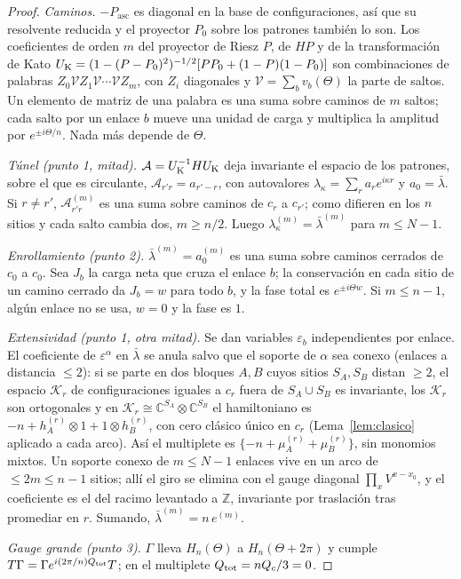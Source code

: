 \documentclass[11pt,a4paper]{article}
\theoremstyle{definition}
\theoremstyle{remark}
\newcommand{\Pasc}{P_{\mathrm{asc}}}
\newcommand{\eps}{\varepsilon}
\begin{document}
\begin{proof}
\emph{Caminos.} $-\Pasc$ es diagonal en la base de configuraciones, así que su resolvente reducida y
el proyector $P_0$ sobre los patrones también lo son. Los coeficientes de orden $m$ del proyector de
Riesz $P$, de $HP$ y de la transformación de Kato
$U_{\rm K}=(1-(P-P_0)^2)^{-1/2}[PP_0+(1-P)(1-P_0)]$ son combinaciones de palabras $Z_0\mathcal VZ_1\mathcal V\cdots\mathcal VZ_m$, con
$Z_i$ diagonales y $\mathcal V=\sum_bv_b(\Theta)$ la parte de saltos. Un elemento de matriz de una palabra es una
suma sobre caminos de $m$ saltos; cada salto por un enlace $b$ mueve una unidad de carga y multiplica la
amplitud por $e^{\pm i\Theta/n}$. Nada más depende de $\Theta$.

\emph{Túnel (punto 1, mitad).} $\mathcal A=U_{\rm K}^{-1}HU_{\rm K}$ deja invariante el espacio de los patrones, sobre el que es
circulante, $\mathcal A_{r'r}=a_{r'-r}$, con autovalores $\lambda_\kappa=\sum_ra_re^{i\kappa r}$ y $a_0=\bar\lambda$. Si
$r\ne r'$, $\mathcal A^{(m)}_{r'r}$ es una suma sobre caminos de $c_r$ a $c_{r'}$; como difieren en los $n$ sitios
y cada salto cambia dos, $m\ge n/2$. Luego $\lambda_\kappa^{(m)}=\bar\lambda^{(m)}$ para $m\le N-1$.

\emph{Enrollamiento (punto 2).} $\bar\lambda^{(m)}=a_0^{(m)}$ es una suma sobre caminos cerrados de
$c_0$ a $c_0$. Sea $J_b$ la carga neta que cruza el enlace $b$; la conservación en cada sitio de un
camino cerrado da $J_b=w$ para todo $b$, y la fase total es $e^{\pm i\Theta w}$. Si $m\le n-1$, algún
enlace no se usa, $w=0$ y la fase es $1$.

\emph{Extensividad (punto 1, otra mitad).} Se dan variables $\eps_b$ independientes por enlace. El
coeficiente de $\eps^\alpha$ en $\bar\lambda$ se anula salvo que el soporte de $\alpha$ sea conexo
(enlaces a distancia $\le2$): si se parte en dos bloques $A,B$ cuyos sitios $S_A,S_B$ distan $\ge2$, el
espacio $\mathcal K_r$ de configuraciones iguales a $c_r$ fuera de $S_A\cup S_B$ es invariante, los $\mathcal K_r$ son
ortogonales y en $\mathcal K_r\cong\mathbb C^{S_A}\otimes\mathbb C^{S_B}$ el hamiltoniano es
$-n+h_A^{(r)}\otimes1+1\otimes h_B^{(r)}$, con cero clásico único en $c_r$ (Lema~\ref{lem:clasico}
aplicado a cada arco). Así el multiplete es $\{-n+\mu_A^{(r)}+\mu_B^{(r)}\}$, sin monomios mixtos. Un
soporte conexo de $m\le N-1$ enlaces vive en un arco de $\le2m\le n-1$ sitios; allí el giro se elimina
con el gauge diagonal $\prod_{x}V^{x-x_0}$, y el coeficiente es el del racimo levantado a $\mathbb Z$,
invariante por traslación tras promediar en $r$. Sumando, $\bar\lambda^{(m)}=n\,e^{(m)}$.

\emph{Gauge grande (punto 3).} $\Gamma$ lleva $H_n(\Theta)$ a $H_n(\Theta+2\pi)$ y cumple
$T\Gamma=\Gamma e^{i(2\pi/n)Q_{\rm tot}}T$; en el multiplete $Q_{\rm tot}=nQ_c/3=0$.
\end{proof}
\end{document}
